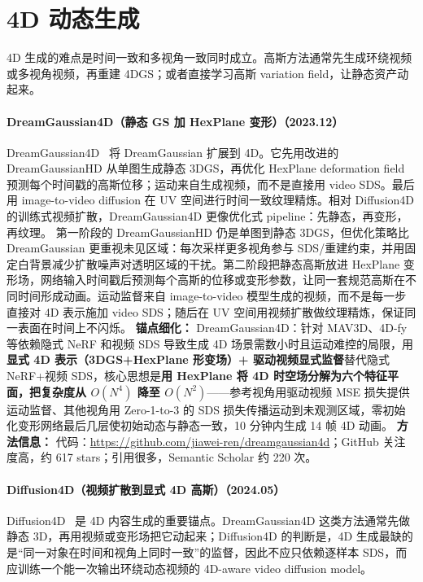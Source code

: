 \section{4D 动态生成}

4D 生成的难点是时间一致和多视角一致同时成立。高斯方法通常先生成环绕视频或多视角视频，再重建 4DGS；或者直接学习高斯 variation field，让静态资产动起来。
\paragraph{DreamGaussian4D（静态 GS 加 HexPlane 变形）（2023.12）}
DreamGaussian4D~\cite{2312_17142} 将 DreamGaussian 扩展到 4D。它先用改进的 DreamGaussianHD 从单图生成静态 3DGS，再优化 HexPlane deformation field 预测每个时间戳的高斯位移；运动来自生成视频，而不是直接用 video SDS。最后用 image-to-video diffusion 在 UV 空间进行时间一致纹理精炼。相对 Diffusion4D 的训练式视频扩散，DreamGaussian4D 更像优化式 pipeline：先静态，再变形，再纹理。
第一阶段的 DreamGaussianHD 仍是单图到静态 3DGS，但优化策略比 DreamGaussian 更重视未见区域：每次采样更多视角参与 SDS/重建约束，并用固定白背景减少扩散噪声对透明区域的干扰。第二阶段把静态高斯放进 HexPlane 变形场，网络输入时间戳后预测每个高斯的位移或变形参数，让同一套规范高斯在不同时间形成动画。运动监督来自 image-to-video 模型生成的视频，而不是每一步直接对 4D 表示施加 video SDS；随后在 UV 空间用视频扩散做纹理精炼，保证同一表面在时间上不闪烁。
\textbf{锚点细化：} DreamGaussian4D：针对 MAV3D、4D-fy 等依赖隐式 NeRF 和视频 SDS 导致生成 4D 场景需数小时且运动难控的局限，用\textbf{显式 4D 表示（3DGS+HexPlane 形变场）+ 驱动视频显式监督}替代隐式 NeRF+视频 SDS，核心思想是\textbf{用 HexPlane 将 4D 时空场分解为六个特征平面，把复杂度从 $O(N^4)$ 降至 $O(N^2)$}——参考视角用驱动视频 MSE 损失提供运动监督、其他视角用 Zero-1-to-3 的 SDS 损失传播运动到未观测区域，零初始化变形网络最后几层使初始动态与静态一致，10 分钟内生成 14 帧 4D 动画。
\textbf{方法信息：} 代码：\url{https://github.com/jiawei-ren/dreamgaussian4d}；GitHub 关注度高，约 617 stars；引用很多，Semantic Scholar 约 220 次。



\paragraph{Diffusion4D（视频扩散到显式 4D 高斯）（2024.05）}
Diffusion4D~\cite{2405_16645} 是 4D 内容生成的重要锚点。DreamGaussian4D 这类方法通常先做静态 3D，再用视频或变形场把它动起来；Diffusion4D 的判断是，4D 生成最缺的是“同一对象在时间和视角上同时一致”的监督，因此不应只依赖逐样本 SDS，而应训练一个能一次输出环绕动态视频的 4D-aware video diffusion model。

